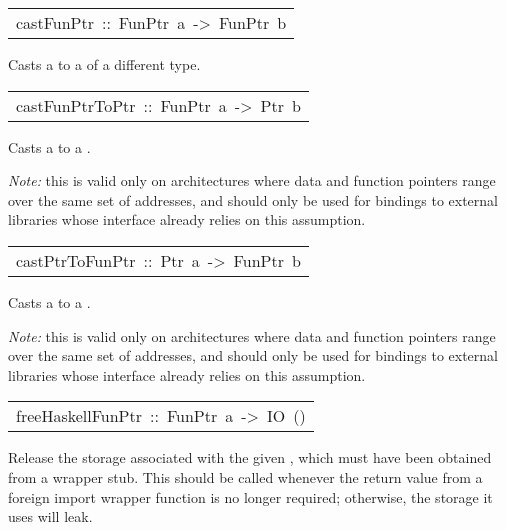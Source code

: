 \begin{haddockdesc}
\item[\begin{tabular}{@{}l}
castFunPtr\ ::\ FunPtr\ a\ ->\ FunPtr\ b
\end{tabular}]\haddockbegindoc
Casts a  to a  of a different type.
\par

\end{haddockdesc}
\begin{haddockdesc}
\item[\begin{tabular}{@{}l}
castFunPtrToPtr\ ::\ FunPtr\ a\ ->\ Ptr\ b
\end{tabular}]\haddockbegindoc
Casts a  to a .
\par
\emph{Note:} this is valid only on architectures where data and function
 pointers range over the same set of addresses, and should only be used
 for bindings to external libraries whose interface already relies on
 this assumption.
\par

\end{haddockdesc}
\begin{haddockdesc}
\item[\begin{tabular}{@{}l}
castPtrToFunPtr\ ::\ Ptr\ a\ ->\ FunPtr\ b
\end{tabular}]\haddockbegindoc
Casts a  to a .
\par
\emph{Note:} this is valid only on architectures where data and function
 pointers range over the same set of addresses, and should only be used
 for bindings to external libraries whose interface already relies on
 this assumption.
\par

\end{haddockdesc}
\begin{haddockdesc}
\item[\begin{tabular}{@{}l}
freeHaskellFunPtr\ ::\ FunPtr\ a\ ->\ IO\ ()
\end{tabular}]\haddockbegindoc
Release the storage associated with the given , which
 must have been obtained from a wrapper stub.  This should be called
 whenever the return value from a foreign import wrapper function is
 no longer required; otherwise, the storage it uses will leak.
\par

\end{haddockdesc}

